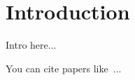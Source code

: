 \section{Introduction}
\label{sec:intro}


Intro here...

You can cite papers like~\cite{Kohler1999}...

